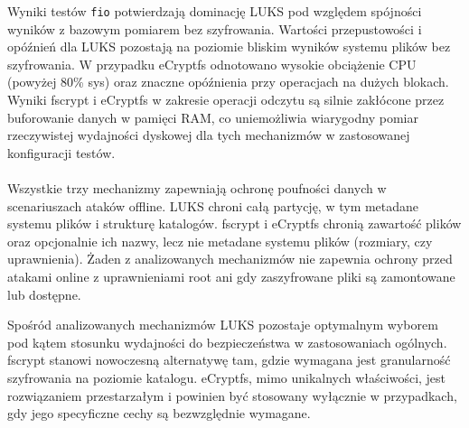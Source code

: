\documentclass[a4paper]{article}
\begin{document}
Wyniki testów \texttt{fio} potwierdzają dominację LUKS pod względem spójności wyników
z bazowym pomiarem bez szyfrowania. Wartości przepustowości i opóźnień dla LUKS pozostają
na poziomie bliskim wyników systemu plików bez szyfrowania. W przypadku eCryptfs odnotowano
wysokie obciążenie CPU (powyżej 80\% sys) oraz znaczne opóźnienia przy operacjach na dużych
blokach. Wyniki fscrypt i eCryptfs w zakresie operacji odczytu są silnie zakłócone przez
buforowanie danych w pamięci RAM, co uniemożliwia wiarygodny pomiar rzeczywistej wydajności
dyskowej dla tych mechanizmów w zastosowanej konfiguracji testów.
\\\\
Wszystkie trzy mechanizmy zapewniają ochronę poufności danych w scenariuszach ataków offline.
LUKS chroni całą partycję, w tym metadane systemu plików i strukturę katalogów. fscrypt
i eCryptfs chronią zawartość plików oraz opcjonalnie ich nazwy, lecz nie metadane systemu
plików (rozmiary, czy uprawnienia). Żaden z analizowanych mechanizmów nie
zapewnia ochrony przed atakami online z uprawnieniami root ani  gdy zaszyfrowane pliki są
zamontowane lub dostępne.

Spośród analizowanych mechanizmów LUKS pozostaje optymalnym wyborem pod kątem stosunku
wydajności do bezpieczeństwa w zastosowaniach ogólnych. fscrypt stanowi nowoczesną
alternatywę tam, gdzie wymagana jest granularność szyfrowania na poziomie katalogu.
eCryptfs, mimo unikalnych właściwości, jest rozwiązaniem przestarzałym i powinien być
stosowany wyłącznie w przypadkach, gdy jego specyficzne cechy są bezwzględnie wymagane.
\end{document}

